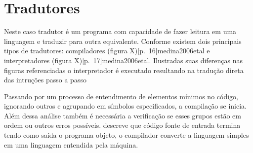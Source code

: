 


\section{Tradutores}


Neste caso tradutor é um programa com capacidade de fazer leitura em uma linguagem e traduzir para outra equivalente. Conforme   existem dois principais tipos de tradutores: compiladores (figura X)[p.~16]{medina2006etal} e interpretadores (figura X)[p.~17]{medina2006etal}. Ilustradas suas diferenças nas figuras referenciadas o interpretador é executado resultando na tradução direta das intruções passo a passo \cite{citar}

Passando por um processo de entendimento de elementos mínimos no código, ignorando outros e agrupando em símbolos especificados, a compilação se inicia. Além dessa análise também é necessária a verificação se esses grupos estão em ordem ou outros erros possíveis.  descreve que código fonte de entrada termina tendo como saída o programa objeto, o compilador converte a linguagem simples em uma linguagem entendida pela máquina.

